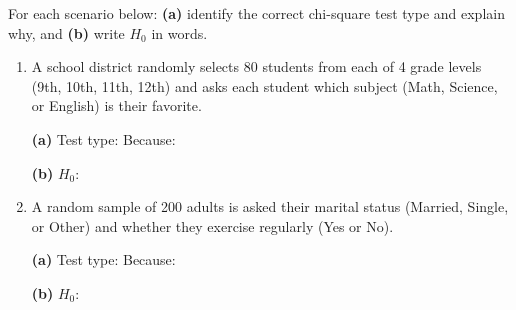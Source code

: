 \documentclass[10pt]{article}
\begin{document}
\namedateperiod

\vspace{0.1in}

For each scenario below: \textbf{(a)} identify the correct chi-square test type and explain
why, and \textbf{(b)} write $H_0$ in words.

\vspace{0.08in}

\begin{enumerate}

  \item A school district randomly selects 80 students from each of 4 grade levels
        (9th, 10th, 11th, 12th) and asks each student which subject (Math, Science, or English)
        is their favorite.

        \textbf{(a)} Test type:  \quad Because: 

        \textbf{(b)} $H_0$: 

  \item A random sample of 200 adults is asked their marital status
        (Married, Single, or Other) and whether they exercise regularly (Yes or No).

        \textbf{(a)} Test type:  \quad Because: 

        \textbf{(b)} $H_0$: 

\end{enumerate}
\end{document}
